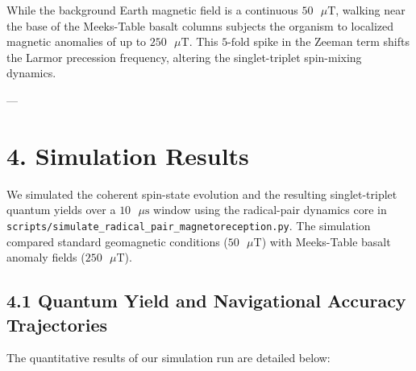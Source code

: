 \documentclass[11pt,twocolumn]{article}
\begin{document}
While the background Earth magnetic field is a continuous $50\text{ }\mu\text{T}$, walking near the base of the Meeks-Table basalt columns subjects the organism to localized magnetic anomalies of up to $250\text{ }\mu\text{T}$. This $5\text{-fold}$ spike in the Zeeman term shifts the Larmor precession frequency, altering the singlet-triplet spin-mixing dynamics.

---

\section{4. Simulation Results}
We simulated the coherent spin-state evolution and the resulting singlet-triplet quantum yields over a $10\text{ }\mu\text{s}$ window using the radical-pair dynamics core in \texttt{scripts/simulate_radical_pair_magnetoreception.py}. The simulation compared standard geomagnetic conditions ($50\text{ }\mu\text{T}$) with Meeks-Table basalt anomaly fields ($250\text{ }\mu\text{T}$).

\subsection{4.1 Quantum Yield and Navigational Accuracy Trajectories}
The quantitative results of our simulation run are detailed below:
\end{document}
